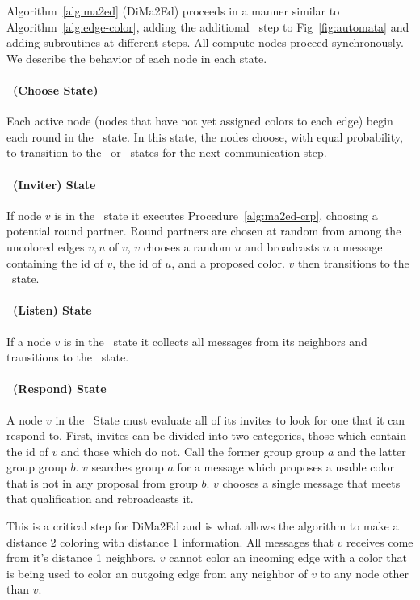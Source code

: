 \label{sec:dima2ed-description}

Algorithm~\ref{alg:ma2ed} (DiMa2Ed) proceeds in a manner similar to Algorithm~\ref{alg:edge-color}, adding the additional \cEd\ step to Fig~\ref{fig:automata} and adding subroutines at different steps. All compute nodes proceed synchronously. We describe the behavior of each node in each state.

\paragraph{\cCd\ (Choose State)}
Each active node (nodes that have not yet assigned colors to each edge) begin each round in the \cCd\ state. In this state, the nodes choose, with equal probability, to transition to the \cId\ or \cLd\ states for the next communication step.

\paragraph{\cId\ (Inviter) State}
If node $v$ is in the \cId\ state it executes Procedure~\ref{alg:ma2ed-crp}, choosing a potential round partner. Round partners are chosen at random from among the uncolored edges $v,u$ of $v$, $v$ chooses a random $u$ and broadcasts $u$ a message containing the id of $v$, the id of $u$, and a proposed color. $v$ then transitions to the \cWd\ state.

\paragraph{\cLd\ (Listen) State}
If a node $v$ is in the \cLd\ state it collects all messages from its neighbors and transitions to the \cRd\ state. 

\paragraph{\cRd\ (Respond) State}
A node $v$ in the \cRd\ State must evaluate all of its invites to look for one that it can respond to. First, invites can be divided into two categories, those which contain the id of $v$ and those which do not. Call the former group group $a$ and the latter group group $b$. $v$ searches group $a$ for a message which proposes a usable color that is not in any proposal from group $b$. $v$ chooses a single message that meets that qualification and rebroadcasts it. 

This is a critical step for DiMa2Ed and is what allows the algorithm to make a distance 2 coloring with distance 1 information. All messages that $v$ receives come from it's distance 1 neighbors. $v$ cannot color an incoming edge with a color that is being used to color an outgoing edge from any neighbor of $v$ to any node other than $v$.

